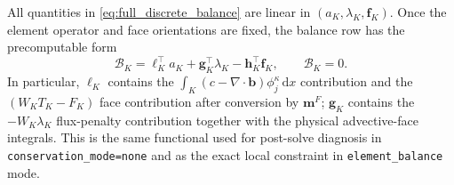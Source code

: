 \documentclass[11pt]{article}
\newcommand{\dd}{\mathrm d}
\begin{document}
All quantities in \eqref{eq:full_discrete_balance} are linear in
$(a_K,\lambda_K,\bm f_K)$.  Once the element operator and face
orientations are fixed, the balance row has the precomputable form
\begin{equation}\label{eq:full_balance_row}
 \boxed{\mathcal B_K
 =\bm\ell_K^\top a_K+\bm g_K^\top\lambda_K
  -\bm h_K^\top\bm f_K,\qquad \mathcal B_K=0.}
\end{equation}
In particular, $\bm\ell_K$ contains the
$\int_K(c-\nabla\cdot\bm b)\phi_j^\kappa\,\dd x$
contribution and the $(W_KT_K-F_K)$ face contribution after
conversion by $\bm m^F$; $\bm g_K$ contains the
$-W_K\lambda_K$ flux-penalty contribution together with the
physical advective-face integrals.  This is the same functional used
for post-solve diagnosis in \texttt{conservation\_mode=none} and as the
exact local constraint in \texttt{element\_balance} mode.
\end{document}
